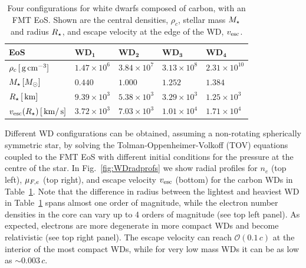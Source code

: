 \begin{table}[t]
  \centering
    \begin{tabular}{|l|l|l|l|l|} %
    \hline
      \textbf{EoS} & \textbf{WD}$_\mathbf{1}$  & \textbf{WD}$_\mathbf{2}$&\textbf{WD}$_\mathbf{3}$ &\textbf{WD}$_\mathbf{4}$\\
      \hline
     $\rho_c\,[{\rm \,g}{\rm \,cm}^{-3}]$ &  $1.47\times 10^{6}$ & $3.84\times 10^{7} $ & $3.13\times 10^{8}$ & $2.31\times 10^{10}$\\
     $M_\star\,[M_\odot]$ & $0.440$ &  $1.000 $ & $1.252$ & $1.384$\\
     $R_\star\,[{\rm \,km}]$ & $9.39\times 10^{3}$ &  $5.38\times 10^{3}$ & $3.29\times 10^3$ & $1.25\times 10^3$\\
     $v_\mathrm{esc}(R_\star) \, [{\rm \,km}/{\rm \,s}]$ & $3.72\times 10^{3}$ & $7.03\times 10^{3}$ & $1.01\times 10^{4}$ & $1.71\times 10^{4}$ \\
      \hline
    \end{tabular}
  \caption{Four configurations for white dwarfs composed of carbon, with an FMT EoS. Shown are the central densities, $\rho_c$, stellar mass $M_\star$ and radius $R_\star$, and escape velocity at the edge of the WD, $v_\mathrm{esc}$. }
    \label{tab:WDs}
\end{table}
 


Different WD configurations can be obtained, assuming a non-rotating spherically symmetric star, by solving the
Tolman-Oppenheimer-Volkoff (TOV) equations~\cite{Tolman:1939jz_StaticSolutionsEinstein,Oppenheimer:1939ne_MassiveNeutronCores} coupled to the FMT EoS with different initial conditions for the pressure at the centre of the star. In Fig.~\ref{fig:WDradprofs} we show radial profiles for $n_e$ (top left), $\mu_{F,e}$ (top right), and escape velocity $v_\mathrm{esc}$ (bottom) for the carbon WDs in Table~\ref{tab:WDs}. Note that the difference in radius between the lightest and heaviest WD in Table~\ref{tab:WDs} spans almost one order of magnitude, while the electron number densities in the core can vary up to 4 orders of magnitude (see top left panel). As expected, electrons are more degenerate in more compact WDs and become relativistic (see top right panel). The escape velocity can reach ${\mathcal{O}}(0.1\,c)$ at the interior of the most compact WDs, while for very low mass WDs 
it can be as low as $\sim0.003\,c$. 

